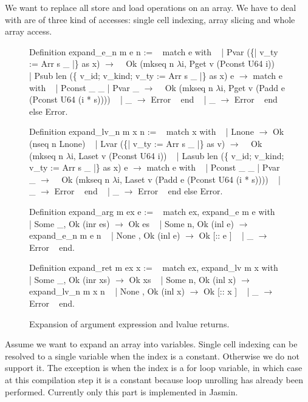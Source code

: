 \documentclass{article}
\begin{document}
\medskip

We want to replace all store and load operations on an array. We have to deal
with are of three kind of accesses: single cell indexing, array slicing and
whole array access.

\smallskip

\begin{figure}[p]
\obeylines\obeyspaces\ttfamily%
Definition expand\_e\_n m e n :=
~ match e with
~ | Pvar (\{| v\_ty := Arr s \_ |\} as x) \(\rightarrow\)
~   Ok (mkseq n \(\lambda\)i, Pget v (Pconst U64 i))
~ | Psub len (\{ v\_id; v\_kind; v\_ty := Arr s \_ |\} as x) e \(\rightarrow\) match e with
~   | Pconst \_ \_ | Pvar \_ \(\rightarrow\)
~     Ok (mkseq n \(\lambda\)i, Pget v (Padd e (Pconst U64 (i * s))))
~   | \_ \(\rightarrow\) Error
~   end
~ | \_ \(\rightarrow\) Error
~ end else Error.
 
Definition expand\_lv\_n m x n :=
~ match x with
~ | Lnone \(\rightarrow\) Ok (nseq n Lnone)
~ | Lvar (\{| v\_ty := Arr s \_ |\} as v) \(\rightarrow\)
~   Ok (mkseq n \(\lambda\)i, Laset v (Pconst U64 i))
~ | Lasub len (\{ v\_id; v\_kind; v\_ty := Arr s \_ |\} as x) e \(\rightarrow\) match e with
~   | Pconst \_ \_ | Pvar \_ \(\rightarrow\)
~     Ok (mkseq n \(\lambda\)i, Laset v (Padd e (Pconst U64 (i * s))))
~   | \_ \(\rightarrow\) Error
~   end
~ | \_ \(\rightarrow\) Error
~ end else Error.

Definition expand\_arg m ex e :=
~ match ex, expand\_e m e with
~ | Some \_, Ok (inr es)  \(\rightarrow\) Ok es
~ | Some n, Ok (inl e)   \(\rightarrow\) expand\_e\_n m e n
~ | None  , Ok (inl e)   \(\rightarrow\) Ok [:: e ]
~ | \_                    \(\rightarrow\) Error
~ end.

Definition expand\_ret m ex x :=
~ match ex, expand\_lv m x with
~ | Some \_, Ok (inr xs)   \(\rightarrow\) Ok xs
~ | Some n, Ok (inl x)    \(\rightarrow\) expand\_lv\_n m x n
~ | None  , Ok (inl x)    \(\rightarrow\) Ok [:: x ]
~ | \_                     \(\rightarrow\) Error
~ end.
\normalfont%
\caption{Expansion of argument expression and lvalue returns.}
\end{figure}

Assume we want to expand an array into variables. Single cell indexing can be
resolved to a single variable when the index is a constant. Otherwise we do not
support it. The exception is when the index is a for loop variable, in which
case at this compilation step it is a constant because loop unrolling has
already been performed.
Currently only this part is implemented in Jasmin.
\end{document}
